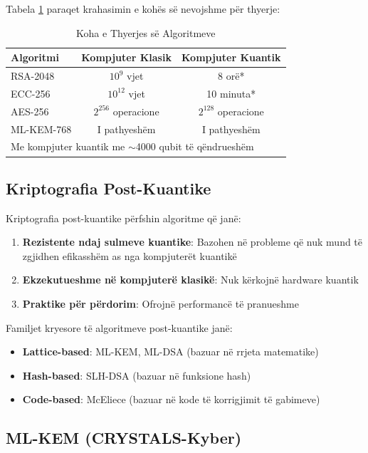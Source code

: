 \documentclass[conference]{IEEEtran}
\begin{document}
Tabela \ref{tab:breaktime} paraqet krahasimin e kohës së nevojshme për thyerje:

\begin{table}[htbp]
\caption{Koha e Thyerjes së Algoritmeve}
\label{tab:breaktime}
\begin{center}
\begin{tabular}{|l|c|c|}
\hline
\textbf{Algoritmi} & \textbf{Kompjuter Klasik} & \textbf{Kompjuter Kuantik} \\
\hline
RSA-2048 & $10^9$ vjet & 8 orë* \\
ECC-256 & $10^{12}$ vjet & 10 minuta* \\
AES-256 & $2^{256}$ operacione & $2^{128}$ operacione \\
ML-KEM-768 & I pathyeshëm & I pathyeshëm \\
\hline
\multicolumn{3}{l}{\footnotesize *Me kompjuter kuantik me $\sim$4000 qubit të qëndrueshëm}
\end{tabular}
\end{center}
\end{table}

\subsection{Kriptografia Post-Kuantike}

Kriptografia post-kuantike përfshin algoritme që janë:
\begin{enumerate}
\item \textbf{Rezistente ndaj sulmeve kuantike}: Bazohen në probleme që nuk mund të zgjidhen efikasshëm as nga kompjuterët kuantikë
\item \textbf{Ekzekutueshme në kompjuterë klasikë}: Nuk kërkojnë hardware kuantik
\item \textbf{Praktike për përdorim}: Ofrojnë performancë të pranueshme
\end{enumerate}

Familjet kryesore të algoritmeve post-kuantike janë:
\begin{itemize}
\item \textbf{Lattice-based}: ML-KEM, ML-DSA (bazuar në rrjeta matematike)
\item \textbf{Hash-based}: SLH-DSA (bazuar në funksione hash)
\item \textbf{Code-based}: McEliece (bazuar në kode të korrigjimit të gabimeve)
\end{itemize}

\subsection{ML-KEM (CRYSTALS-Kyber)}
\end{document}
